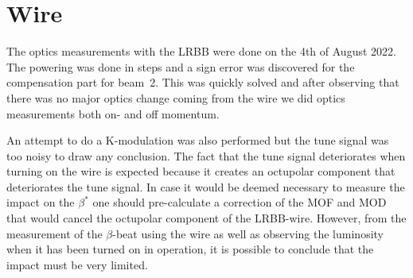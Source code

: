 \documentclass{cernatsnote}
\begin{document}
\section{Wire}
The optics measurements with the LRBB were done on the 4th of August 2022. The powering was done in steps and a sign error was discovered for the compensation part for beam~2. This was quickly solved and after observing that there was no major optics change coming from the wire we did optics measurements both on- and off momentum.

An attempt to do a K-modulation was also performed but the tune signal was too noisy to draw any conclusion. The fact that the tune signal deteriorates when turning on the wire is expected because it creates an octupolar component that deteriorates the tune signal. In case it would be deemed necessary to measure the impact on the $\beta^*$ one should pre-calculate a correction of the MOF and MOD that would cancel the octupolar component of the LRBB-wire. However, from the measurement of the $\beta$-beat using the wire as well as observing the luminosity when it has been turned on in operation, it is possible to conclude that the impact must be very limited. 
\end{document}
